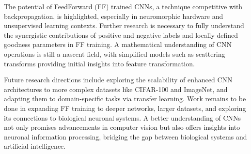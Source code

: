 \documentclass{article}
\begin{document}
The potential of FeedForward (FF) trained CNNs, a technique competitive with backpropagation, is highlighted, especially in neuromorphic hardware and unsupervised learning contexts. Further research is necessary to fully understand the synergistic contributions of positive and negative labels and locally defined goodness parameters in FF training. A mathematical understanding of CNN operations is still a nascent field, with simplified models such as scattering transforms providing initial insights into feature transformation.

Future research directions include exploring the scalability of enhanced CNN architectures to more complex datasets like CIFAR-100 and ImageNet, and adapting them to domain-specific tasks via transfer learning. Work remains to be done in expanding FF training to deeper networks, larger datasets, and exploring its connections to biological neuronal systems. A better understanding of CNNs not only promises advancements in computer vision but also offers insights into neuronal information processing, bridging the gap between biological systems and artificial intelligence.
\end{document}
